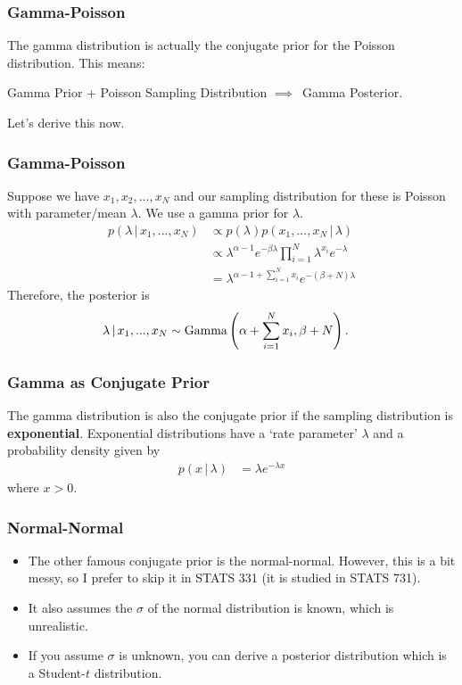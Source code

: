 \documentclass{beamer}
\newcommand{\given}{\,|\,}
\begin{document}
\begin{frame}
\frametitle{Gamma-Poisson}

The gamma distribution is actually the conjugate prior for the Poisson distribution. This means:

Gamma Prior + Poisson Sampling Distribution $\implies$~Gamma Posterior.

Let's derive this now.


\end{frame}


\begin{frame}
\frametitle{Gamma-Poisson}
Suppose we have $x_1, x_2, ..., x_N$ and our sampling distribution for these
is Poisson with parameter/mean $\lambda$. We use a gamma prior for $\lambda$.
\pause
\begin{align}
p(\lambda \given x_1, ..., x_N)
    &\propto p(\lambda)p(x_1, ..., x_N \given \lambda) \\
    &\propto \lambda^{\alpha-1}e^{-\beta \lambda}
            \prod_{i=1}^N \lambda^{x_i}e^{-\lambda} \\
    &= \lambda^{\alpha - 1 + \sum_{i=1}^N x_i}e^{-(\beta + N)\lambda}
\end{align}
Therefore, the posterior is
\begin{align}
\lambda \given x_1, ..., x_N &\sim
    \textnormal{Gamma}\left(\alpha + \sum_{i=1}^N x_i, \beta + N\right).
\end{align}



\end{frame}


\begin{frame}
\frametitle{Gamma as Conjugate Prior}
The gamma distribution is also the conjugate prior if the sampling
distribution is {\bf exponential}. Exponential distributions have a
`rate parameter' $\lambda$ and a probability density given by
\begin{align}
p(x \given \lambda) &= \lambda e^{-\lambda x}
\end{align}
where $x > 0$.

\end{frame}

\begin{frame}
\frametitle{Normal-Normal}
\begin{itemize}
\item The other famous conjugate prior is the normal-normal. However, this is a bit
messy, so I prefer to skip it in STATS 331 (it is studied in STATS 731).\pause
\item It also assumes the $\sigma$ of the normal distribution is known, which
is unrealistic.\pause
\item If you assume $\sigma$ is unknown, you can derive a posterior distribution
which is a Student-$t$ distribution.
\end{itemize}

\end{frame}
\end{document}
